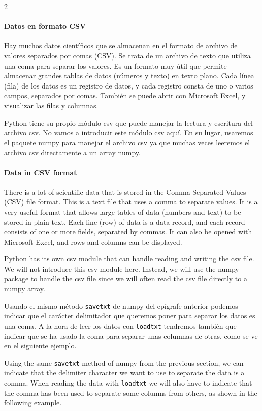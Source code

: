 \begin{paracol}{2}
\paragraph*{Datos en formato CSV}
    Hay muchos datos científicos que se almacenan en el formato de archivo de valores separados por comas (CSV). Se trata de un archivo de texto que utiliza una coma para separar los valores. Es un formato muy útil que permite almacenar grandes tablas de datos (números y texto) en texto plano. Cada línea (fila) de los datos es un registro de datos, y cada registro consta de uno o varios campos, separados por comas. También se puede abrir con Microsoft Excel, y visualizar las filas y columnas.

    Python tiene su propio módulo csv que puede manejar la lectura y escritura del archivo csv. No vamos a introducir este módulo csv aquí. En su lugar, usaremos el paquete numpy para manejar el archivo csv ya que muchas veces leeremos el archivo csv directamente a un array numpy.

\switchcolumn

\paragraph*{Data in CSV format}
    There is a lot of scientific data that is stored in the Comma Separated Values (CSV) file format. This is a text file that uses a comma to separate values. It is a very useful format that allows large tables of data (numbers and text) to be stored in plain text. Each line (row) of data is a data record, and each record consists of one or more fields, separated by commas. It can also be opened with Microsoft Excel, and rows and columns can be displayed.

    Python has its own csv module that can handle reading and writing the csv file. We will not introduce this csv module here. Instead, we will use the numpy package to handle the csv file since we will often read the csv file directly to a numpy array.

\switchcolumn

    Usando el mismo método \texttt{savetxt} de numpy del epígrafe anterior podemos indicar que el carácter delimitador que queremos poner para separar los datos es una coma. A la hora de leer los datos con \texttt{loadtxt} tendremos también que indicar que se ha usado la coma para separar unas columnas de otras, como se ve en el siguiente ejemplo.

\switchcolumn

    Using the same \texttt{savetxt} method of numpy from the previous section, we can indicate that the delimiter character we want to use to separate the data is a comma. When reading the data with \texttt{loadtxt} we will also have to indicate that the comma has been used to separate some columns from others, as shown in the following example.

\end{paracol}


